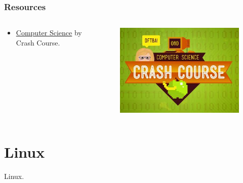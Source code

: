 \documentclass[aspectratio=169]{beamer}
\begin{document}
\begin{frame}
    \frametitle{Resources}
    \begin{columns}
        \begin{column}{0.5\textwidth}
            \begin{itemize}
                \item \href{https://thecrashcourse.com/topic/computerscience/}
                    {Computer Science} by Crash Course.
            \end{itemize}
        \end{column}
        \begin{column}{0.5\textwidth}
            \begin{figure}
                \centering
                \includegraphics[scale=0.4]
                {img/crash_course_computer_science.jpg}
            \end{figure}
        \end{column}
    \end{columns}
\end{frame}



\section{Linux}



\begin{frame}
    Linux.
\end{frame}
\end{document}
